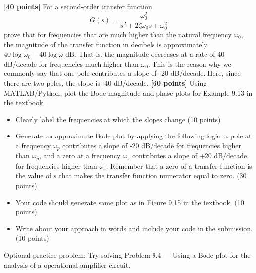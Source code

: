 \documentclass{ee122_pset}
\author{\rule{3cm}{0.4pt}} %
\begin{document}
 \textbf{[40 points]} For a second-order transfer function
\[
G(s) = \frac{\omega_0^2}{s^2 + 2\zeta\omega_0 s + \omega_0^2}
\]
prove that for frequencies that are much higher than the natural frequency $\omega_0$, the magnitude of the transfer function in decibels is approximately $40\log\omega_0 - 40\log\omega$ dB. That is, the magnitude decreases at a rate of 40 dB/decade for frequencies much higher than $\omega_0$. This is the reason why we commonly say that one pole contributes a slope of -20 dB/decade. Here, since there are two poles, the slope is -40 dB/decade.
 \textbf{[60 points]} Using MATLAB/Python, plot the Bode magnitude and phase plots for Example 9.13 in the textbook. 
\begin{itemize}
\item Clearly label the frequencies at which the slopes change (10 points)
\item Generate an approximate Bode plot by applying the following logic: a pole at a frequency $\omega_p$ contributes a slope of -20 dB/decade for frequencies higher than $\omega_p$, and a zero at a frequency $\omega_z$ contributes a slope of +20 dB/decade for frequencies higher than $\omega_z$. Remember that a zero of a transfer function is the value of $s$ that makes the transfer function numerator equal to zero. (30 points)
\item Your code should generate same plot as in Figure 9.15 in the textbook. (10 points)
\item Write about your approach in words and include your code in the submission. (10 points)
\end{itemize}

Optional practice problem: Try solving Problem 9.4 --- Using a Bode plot for the analysis of a operational amplifier circuit.
\end{document}
